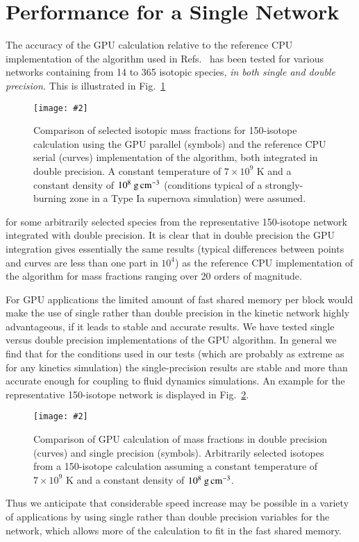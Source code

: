 \documentclass[]{elsart}
\newlength{\figdn}
\newcommand{\fig}[1]{Fig.~\ref{fig:#1}}
\newcommand{\units}[1]{\mbox{\ #1}}
\newcommand{\singlefig}[6]{%
\begin{figure} \vspace{#3}%
\begin{flushright}%
\texttt{[image: \#2]}%
\end{flushright}%
\caption{\label{fig:#1} #6}%
\vspace{#4}%
\end{figure}}
\begin{document}
\section{Performance for a Single Network}


The accuracy of the GPU calculation relative to the reference CPU implementation 
of the algorithm used in Refs.\ \cite{guidJCP,guidAsy,guidQSS,guidPE} has been 
tested for various networks containing from 14 to 365 isotopic species,
\textit{in both single and double precision.}  This is illustrated in 
\fig{massFractionGPU_CPU_150}%
%
%
\singlefig
{massFractionGPU_CPU_150}
{figures/massFractionGPU_CPU_150.eps}
{0pt}
{\figdn}
{0.80}
{Comparison of selected isotopic mass fractions for 150-isotope calculation 
using the GPU parallel (symbols) and the reference CPU serial (curves) 
implementation of the algorithm, both integrated in double precision. A constant 
temperature of $7 \times 10^9$ K and a constant density of $10^8 
\units{g\,cm}^{-3}$ (conditions typical of a strongly-burning zone in a Type Ia 
supernova simulation) were assumed. }
%
%
for some arbitrarily selected species from the representative 150-isotope 
network integrated with double precision. It is clear that in double precision 
the GPU integration gives essentially the same results (typical differences 
between points and curves are less than one part in $10^4$) as the reference CPU 
implementation of the algorithm for mass fractions ranging over 20 orders of 
magnitude.

For GPU applications the limited amount of fast shared memory per block would 
make the use of single rather than double precision in the kinetic network 
highly advantageous, if it leads to stable and accurate results.  We have tested 
single versus double precision implementations of the GPU algorithm.  In general 
we find that for the conditions used in our tests (which are probably as 
extreme as for any kinetics simulation) the single-precision results are 
stable and more than accurate enough for coupling to fluid dynamics simulations. 
 An example for the representative 150-isotope network is displayed in 
\fig{singleVsDouble_150}.%
%
%
\singlefig
{singleVsDouble_150}
{figures/singleVsDouble_150.eps}
{0pt}
{\figdn}
{0.80}
{Comparison of GPU calculation of mass fractions in double precision (curves) 
and single precision (symbols). Arbitrarily selected isotopes from a 
150-isotope calculation assuming a constant 
temperature of $7 \times 10^9$ K and a constant density of $10^8 
\units{g\,cm}^{-3}$. }
%
%
Thus we anticipate that considerable speed increase may be possible in a 
variety of applications by using single rather than double precision variables 
for the network, which allows more of the calculation to fit in the fast shared 
memory.
\end{document}
